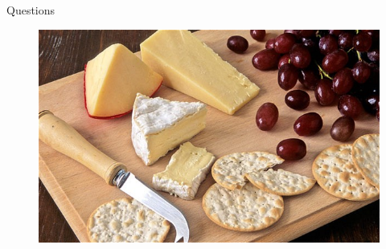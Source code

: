 \documentclass{beamer}
\begin{document}
\begin{frame}{Questions}
	\begin{figure}
		\centering
		\includegraphics[width=\textwidth]{../images/cheese.jpg}
	\end{figure}
\end{frame}
\end{document}
